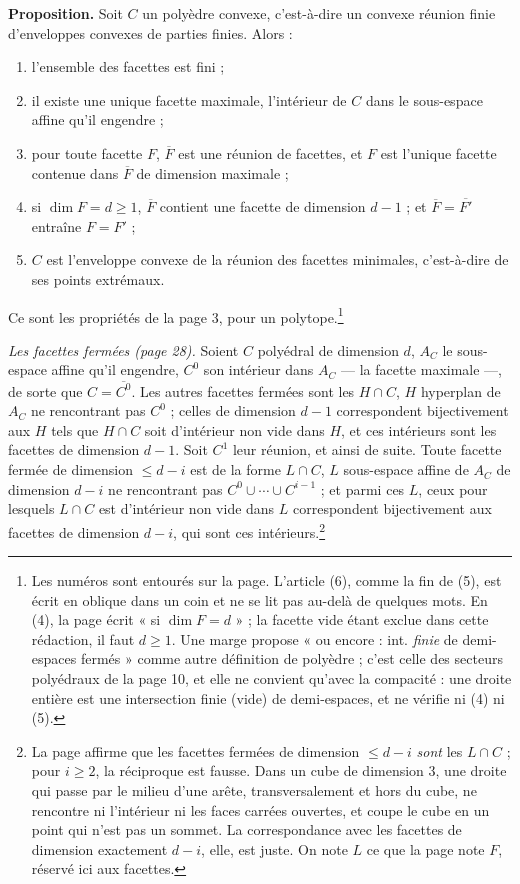 \documentclass[11pt,a4paper]{article}
\begin{document}
\textbf{Proposition.} Soit $C$ un polyèdre convexe, c'est-à-dire un convexe
réunion finie d'enveloppes convexes de parties finies. Alors :
\begin{enumerate}
\item[(1)] l'ensemble des facettes est fini ;
\item[(2)] il existe une unique facette maximale, l'intérieur de $C$ dans le
sous-espace affine qu'il engendre ;
\item[(3)] pour toute facette $F$, $\overline{F}$ est une réunion de facettes, et
$F$ est l'unique facette contenue dans $\overline{F}$ de dimension maximale ;
\item[(4)] si $\dim F = d \geq 1$, $\overline{F}$ contient une facette de
dimension $d - 1$ ; et $\overline{F} = \overline{F'}$ entraîne $F = F'$ ;
\item[(5)] $C$ est l'enveloppe convexe de la réunion des facettes minimales,
c'est-à-dire de ses points extrémaux.
\end{enumerate}
Ce sont les propriétés de la page 3, pour un polytope.\footnote{Les numéros sont entourés sur la page. L'article (6), comme la fin de
(5), est écrit en oblique dans un coin et ne se lit pas au-delà de quelques
mots. En (4), la page écrit « si $\dim F = d$ » ; la facette vide étant exclue
dans cette rédaction, il faut $d \geq 1$. Une marge propose « ou encore : int. \emph{finie} de demi-espaces
fermés » comme autre définition de polyèdre ; c'est celle des secteurs
polyédraux de la page 10, et elle ne convient qu'avec la compacité : une droite
entière est une intersection finie (vide) de demi-espaces, et ne vérifie ni
(4) ni (5).}

\emph{Les facettes fermées (page 28).} Soient $C$ polyédral de dimension $d$,
$A_{C}$ le sous-espace affine qu'il engendre, $C^{0}$ son intérieur dans
$A_{C}$ --- la facette maximale ---, de sorte que $C = \overline{C^{0}}$. Les
autres facettes fermées sont les $H \cap C$, $H$ hyperplan de $A_{C}$ ne
rencontrant pas $C^{0}$ ; celles de dimension $d - 1$ correspondent
bijectivement aux $H$ tels que $H \cap C$ soit d'intérieur non vide dans $H$, et
ces intérieurs sont les facettes de dimension $d - 1$. Soit $C^{1}$ leur
réunion, et ainsi de suite. Toute facette fermée de dimension $\leq d - i$ est
de la forme $L \cap C$, $L$ sous-espace affine de $A_{C}$ de dimension $d - i$ ne
rencontrant pas $C^{0} \cup \cdots \cup C^{i-1}$ ; et parmi ces $L$, ceux pour
lesquels $L \cap C$ est d'intérieur non vide dans $L$ correspondent
bijectivement aux facettes de dimension $d - i$, qui sont ces
intérieurs.\footnote{La page affirme que les facettes fermées de dimension
$\leq d - i$ \emph{sont} les $L \cap C$ ; pour $i \geq 2$, la réciproque est
fausse. Dans un cube de dimension 3, une droite qui passe par le milieu d'une
arête, transversalement et hors du cube, ne rencontre ni l'intérieur ni les
faces carrées ouvertes, et coupe le cube en un point qui n'est pas un sommet.
La correspondance avec les facettes de dimension exactement $d - i$, elle, est
juste. On note $L$ ce que la page note $F$, réservé ici aux facettes.}
\end{document}
